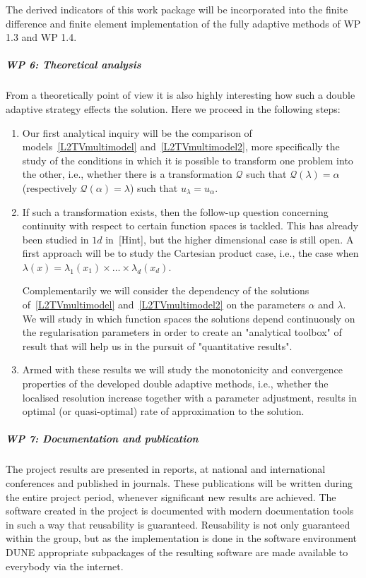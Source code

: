 \documentclass[enabledeprecatedfontcommands,cleardoublepage=empty,headsepline,twoside,11pt,DIV=15,BCOR=12mm,final]{scrartcl}
\begin{document}
The derived indicators of this work package will be incorporated into the finite difference and finite element implementation of the fully adaptive methods of WP 1.3 and WP 1.4.
 
 \subparagraph{WP 6: Theoretical analysis}

From a theoretically point of view it is also highly interesting how such a double adaptive strategy effects the solution. Here we proceed in the following steps:
 
 \begin{enumerate}
 \item Our first analytical inquiry will be the comparison of models~\eqref{L2TVmultimodel} and~\eqref{L2TVmultimodel2}, more specifically the study of the conditions in which it is possible to transform one problem into the other, i.e., whether there is a transformation $\mathcal{Q}$ such that $\mathcal{Q}(\lambda)=\alpha$ (respectively $\mathcal{Q}(\alpha)=\lambda$) such that $u_\lambda = u_\alpha$. 
 
 \item If such a transformation exists, then the follow-up question concerning continuity with respect to certain function spaces is tackled. This has already been studied in $1d$ in~{[Hint]}, 
but the higher dimensional case is still open. A first approach will be to study the Cartesian product case, i.e., the case when $\lambda(x)=\lambda_1(x_1)\times \dots \times \lambda_d(x_d)$.

Complementarily we will consider the dependency of the solutions of~\eqref{L2TVmultimodel} and~\eqref{L2TVmultimodel2} on the parameters  $\alpha$ and $\lambda$. We will study in which function spaces the solutions depend continuously on the regularisation parameters in order to create an "analytical toolbox" of result that will help us in the pursuit of "quantitative results". 
 
 \item Armed with these results we will study the monotonicity and convergence properties of the developed double adaptive methods, i.e., whether the localised resolution increase together with a parameter adjustment, results in optimal (or quasi-optimal) rate of approximation to the solution. 
 \end{enumerate} 
 
 \subparagraph{WP 7: Documentation and publication}
 
 The project results are presented in reports, at national and international conferences and published in journals. These publications will be written during the entire project period, whenever significant new results are achieved. The software created in the project is documented with modern documentation tools in such a way that reusability is guaranteed. Reusability is not only guaranteed within the group, but as the implementation is done in the software environment DUNE appropriate subpackages of the resulting software are made available to everybody via the internet.
 
\end{document}
